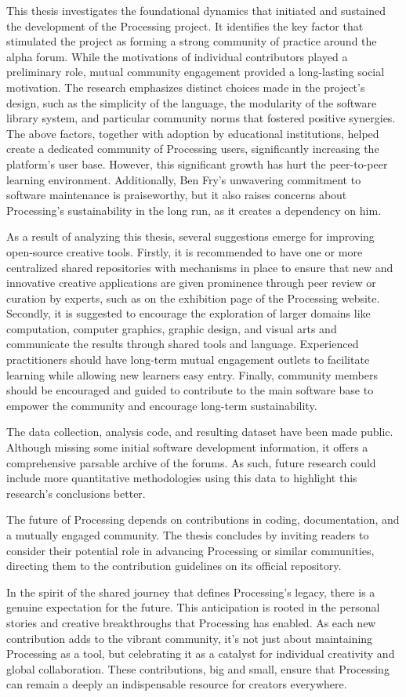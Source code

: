 This thesis investigates the foundational dynamics that initiated and sustained the development of the Processing project. It identifies the key factor that stimulated the project as forming a strong community of practice around the alpha forum. While the motivations of individual contributors played a preliminary role, mutual community engagement provided a long-lasting social motivation. The research emphasizes distinct choices made in the project's design, such as the simplicity of the language, the modularity of the software library system, and particular community norms that fostered positive synergies. The above factors, together with adoption by educational institutions, helped create a dedicated community of Processing users, significantly increasing the platform's user base. However, this significant growth has hurt the peer-to-peer learning environment. Additionally, Ben Fry's unwavering commitment to software maintenance is praiseworthy, but it also raises concerns about Processing's sustainability in the long run, as it creates a dependency on him.

As a result of analyzing this thesis, several suggestions emerge for improving open-source creative tools. Firstly, it is recommended to have one or more centralized shared repositories with mechanisms in place to ensure that new and innovative creative applications are given prominence through peer review or curation by experts, such as on the exhibition page of the Processing website. Secondly, it is suggested to encourage the exploration of larger domains like computation, computer graphics, graphic design, and visual arts and communicate the results through shared tools and language. Experienced practitioners should have long-term mutual engagement outlets to facilitate learning while allowing new learners easy entry. Finally, community members should be encouraged and guided to contribute to the main software base to empower the community and encourage long-term sustainability.

The data collection, analysis code, and resulting dataset have been made public. Although missing some initial software development information, it offers a comprehensive parsable archive of the forums. As such, future research could include more quantitative methodologies using this data to highlight this research's conclusions better.

The future of Processing depends on contributions in coding, documentation, and a mutually engaged community. The thesis concludes by inviting readers to consider their potential role in advancing Processing or similar communities, directing them to the contribution guidelines on its official repository. 

In the spirit of the shared journey that defines Processing's legacy, there is a genuine expectation for the future. This anticipation is rooted in the  personal stories and creative breakthroughs that Processing has enabled. As each new contribution adds to the vibrant community, it's not just about maintaining Processing as a tool, but celebrating it as a catalyst for individual creativity and global collaboration. These contributions, big and small, ensure that Processing can remain a deeply an indispensable resource for creators everywhere.